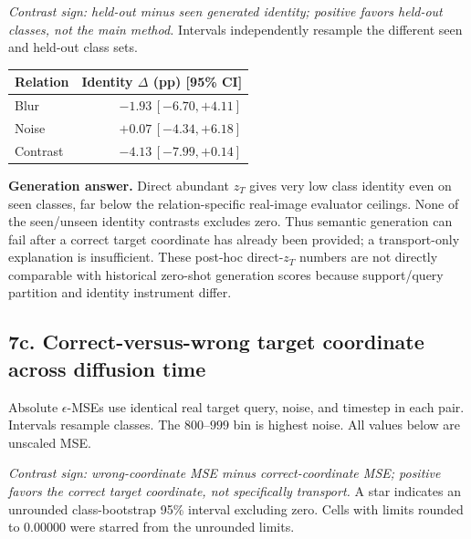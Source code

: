 \documentclass[10pt]{article}
\begin{document}
\emph{Contrast sign: held-out minus seen generated identity; positive favors held-out classes, not the main method.} Intervals independently resample the different seen and held-out class sets.

\begin{center}\small
\begin{tabular}{lr}
\toprule
Relation & Identity $\Delta$ (pp) [95\% CI]\\
\midrule
Blur & $-1.93\,[-6.70,+4.11]$\\
Noise & $+0.07\,[-4.34,+6.18]$\\
Contrast & $-4.13\,[-7.99,+0.14]$\\
\bottomrule
\end{tabular}
\end{center}

\textbf{Generation answer.} Direct abundant $z_T$ gives very low class identity even on seen classes, far below the relation-specific real-image evaluator ceilings. None of the seen/unseen identity contrasts excludes zero. Thus semantic generation can fail after a correct target coordinate has already been provided; a transport-only explanation is insufficient. These post-hoc direct-$z_T$ numbers are not directly comparable with historical zero-shot generation scores because support/query partition and identity instrument differ.

\subsection*{7c. Correct-versus-wrong target coordinate across diffusion time}

Absolute $\epsilon$-MSEs use identical real target query, noise, and timestep in each pair. Intervals resample classes. The $800$--$999$ bin is highest noise. All values below are unscaled MSE.

\emph{Contrast sign: wrong-coordinate MSE minus correct-coordinate MSE; positive favors the correct target coordinate, not specifically transport.} A star indicates an unrounded class-bootstrap 95\% interval excluding zero. Cells with limits rounded to $0.00000$ were starred from the unrounded limits.
\end{document}
